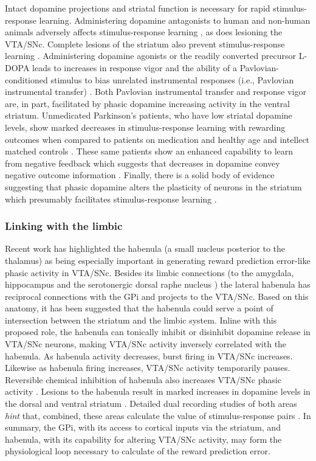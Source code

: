 Intact dopamine projections and striatal function is necessary for rapid stimulus-response learning.  Administering dopamine antagonists to human and non-human animals adversely affects stimulus-response learning \cite{Pizzagalli:2010p7205}, as does lesioning the VTA/SNc.  Complete lesions of the striatum also prevent stimulus-response learning \cite{Packard:2002p5074}.  Administering dopamine agonists or the readily converted precursor L-DOPA leads to increases in response vigor and the ability of a Pavlovian-conditioned stimulus to bias unrelated instrumental responses (i.e., Pavlovian instrumental transfer) \cite{Winterbauer:2007p6352}. Both Pavlovian instrumental transfer and response vigor are, in part, facilitated by phasic dopamine increasing activity in the ventral striatum.  Unmedicated Parkinson's patients, who have low striatal dopamine levels, show marked decreases in stimulus-response learning with rewarding outcomes when compared to patients on medication and healthy age and intellect matched controls \cite{Pizzagalli:2010p7205}.  These same patients show an enhanced capability to learn from negative feedback which suggests that decreases in dopamine convey negative outcome information \cite{Frank:2004p4709}.  Finally, there is a solid body of evidence suggesting that phasic dopamine alters the plasticity of neurons in the striatum which presumably facilitates stimulus-response learning \cite{Calabresi:2007p4284}.

\subsubsection{Linking with the limbic}
\label{subsub:limbic}
Recent work has highlighted the habenula (a small nucleus posterior to the thalamus) as being especially important in generating reward prediction error-like phasic activity in VTA/SNc.  Besides its limbic connections (to the amygdala, hippocampus and the serotonergic dorsal raphe nucleus \cite{Hikosaka:2008p4455}) the lateral habenula has reciprocal connections with the GPi and projects to the VTA/SNc.  Based on this anatomy, it has been suggested that the habenula could serve a point of intersection between the striatum and the limbic system.  Inline with this proposed role, the habenula can tonically inhibit or disinhibit dopamine release in VTA/SNc neurons, making VTA/SNc activity inversely correlated with the habenula.  As habenula activity decreases, burst firing in VTA/SNc increases.  Likewise as habenula firing increases, VTA/SNc activity temporarily pauses.  Reversible chemical inhibition of habenula also increases VTA/SNc phasic activity \cite{Hikosaka:2008p4455}.  Lesions to the habenula result in marked increases in dopamine levels in the dorsal and ventral striatum \cite{BrombergMartin:2010p7221}.  Detailed dual recording studies of both areas \emph{hint} that, combined, these areas calculate the value of stimulus-response pairs \cite{BrombergMartin:2010p7221}.  In summary, the GPi, with its access to cortical inputs via the striatum, and habenula, with its capability for altering VTA/SNc activity, may form the physiological loop necessary to calculate of the reward prediction error.

